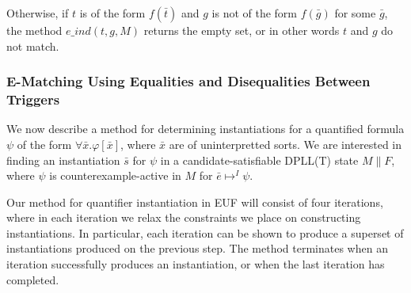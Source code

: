 \documentclass{llncs}
\begin{document}
Otherwise, if $t$ is of the form $f(\bar{t})$ and $g$ is not of the form $f( \bar{g})$ for some $\bar{g}$, the method $e\_ind(t,g,M)$ returns the empty set, or in other words $t$ and $g$ do not match.


\begin{comment}
We will also be interested in classifying which pairs of terms may potentially be $E$-induced.
For a quantified formula $\psi$, a term $f( t_1, \ldots, t_n ) \mapsto^I \psi$ is \emph{equality-compatible with term $s$ in $M$} if and only if $s$ is of the form $f( s_1, \ldots s_n )$ and $M \models_T t_1 = s_1 \wedge \ldots \wedge t_n = s_n$.
A term $f( t_1, \ldots, t_n ) \mapsto^I \psi$ is \emph{equality-independent from term $s$ in $M$} if (a) $s$ is of the form $g( s_1, \ldots s_m )$, or (b) $s$ is of the form $f( s_1, \ldots s_n )$ in $M$, and $M \models_T t_i \neq s_i$ for some $i$. 
A pair of terms $t, s$ where $t \mapsto^I \psi$ is \emph{equality-ambiguous} if $t$ is neither equality-compatible nor equality-independent from $s$.
\end{comment}

\subsubsection{E-Matching Using Equalities and Disequalities Between Triggers}

We now describe a method for determining instantiations for a quantified formula $\psi$ of the form $\forall \bar{x}. \varphi[\bar{x}]$, where $\bar{x}$ are of uninterpretted sorts.
We are interested in finding an instantiation $\bar{s}$ for $\psi$ in a candidate-satisfiable DPLL(T) state $M \parallel F$, where $\psi$ is counterexample-active in $M$ for $\bar{e} \mapsto^I \psi$.

Our method for quantifier instantiation in EUF will consist of four iterations, where in each iteration we relax the constraints we place on constructing instantiations.
In particular, each iteration can be shown to produce a superset of instantiations produced on the previous step.
The method terminates when an iteration successfully produces an instantiation, or when the last iteration has completed.
\end{document}
